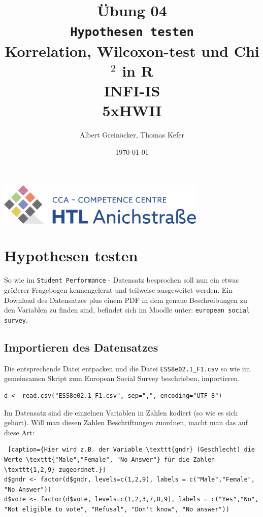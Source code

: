 \documentclass{article}
\title{Übung 04 \\ \texttt{Hypothesen testen} \\ Korrelation, Wilcoxon-test und Chi$^{2}$ in \textbf{R} \\ INFI-IS \\ 5xHWII} %
\author{Albert Greinöcker, Thomas Kefer}
\date{\today} %
\begin{document}
	
	\maketitle %
	
	\begin{center}
		
		\includegraphics[width=10cm]{../images/logo.png}
	\end{center}
	\vspace{1cm}

\section{Hypothesen testen}


So wie im \texttt{Student Performance} - Datensatz besprochen soll nun ein etwas größerer Fragebogen kennengelernt und teilweise ausgeweitet werden. Ein Download des Datensatzes plus einem PDF in dem genaue Beschreibungen zu den Variablen zu finden sind, befindet sich im Moodle unter: \texttt{european social survey}.


\subsection{Importieren des Datensatzes}

Die entsprechende Datei entpacken und die Datei \texttt{ESS8e02.1\_F1.csv}  so wie im gemeinsamen Skript zum European Social Survey beschrieben, importieren.

 \begin{lstlisting} 
d <- read.csv("ESS8e02.1_F1.csv", sep=",", encoding="UTF-8") 
 \end{lstlisting}

Im Datensatz sind die einzelnen Variablen in Zahlen kodiert (so wie es sich gehört). Will man diesen Zahlen Beschriftungen zuordnen, macht man das auf diese Art:

 \begin{lstlisting} [caption={Hier wird z.B. der Variable \texttt{gndr} (Geschlecht) die Werte \texttt{"Male","Female", "No Answer"} für die Zahlen \texttt{1,2,9} zugeordnet.}]
d$gndr <- factor(d$gndr, levels=c(1,2,9), labels = c("Male","Female", "No Answer"))
d$vote <- factor(d$vote, levels=c(1,2,3,7,8,9), labels = c("Yes","No", "Not eligible to vote", "Refusal", "Don't know", "No answer"))
 \end{lstlisting}
\end{document}

